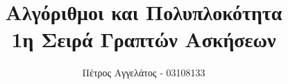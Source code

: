 \title{
  Αλγόριθμοι και Πολυπλοκότητα\\
  1η Σειρά Γραπτών Ασκήσεων
}
\ifanonymous{\iflncs
\author{}\institute{}
\fi}
\else
\author{Πέτρος Αγγελάτος - 03108133}
\iflncs
{}
\else
{}
\fi
\fi

